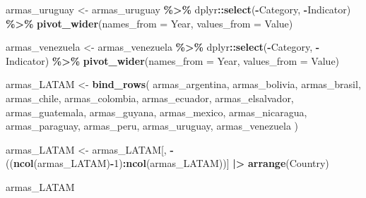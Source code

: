 \documentclass[
  11pt,
]{article}
\newenvironment{Shaded}{\begin{snugshade}}{\end{snugshade}}
\newcommand{\AttributeTok}[1]{\textcolor[rgb]{0.13,0.29,0.53}{#1}}
\newcommand{\DecValTok}[1]{\textcolor[rgb]{0.00,0.00,0.81}{#1}}
\newcommand{\FunctionTok}[1]{\textcolor[rgb]{0.13,0.29,0.53}{\textbf{#1}}}
\newcommand{\NormalTok}[1]{#1}
\newcommand{\OtherTok}[1]{\textcolor[rgb]{0.56,0.35,0.01}{#1}}
\newcommand{\SpecialCharTok}[1]{\textcolor[rgb]{0.81,0.36,0.00}{\textbf{#1}}}
\begin{document}
\begin{Shaded}
\begin{Highlighting}[]
\NormalTok{armas\_uruguay }\OtherTok{\textless{}{-}}\NormalTok{ armas\_uruguay }\SpecialCharTok{\%\textgreater{}\%}
\NormalTok{  dplyr}\SpecialCharTok{::}\FunctionTok{select}\NormalTok{(}\SpecialCharTok{{-}}\NormalTok{Category, }\SpecialCharTok{{-}}\NormalTok{Indicator) }\SpecialCharTok{\%\textgreater{}\%}
  \FunctionTok{pivot\_wider}\NormalTok{(}\AttributeTok{names\_from =}\NormalTok{ Year, }\AttributeTok{values\_from =}\NormalTok{ Value)}

\NormalTok{armas\_venezuela }\OtherTok{\textless{}{-}}\NormalTok{ armas\_venezuela }\SpecialCharTok{\%\textgreater{}\%}
\NormalTok{  dplyr}\SpecialCharTok{::}\FunctionTok{select}\NormalTok{(}\SpecialCharTok{{-}}\NormalTok{Category, }\SpecialCharTok{{-}}\NormalTok{Indicator) }\SpecialCharTok{\%\textgreater{}\%}
  \FunctionTok{pivot\_wider}\NormalTok{(}\AttributeTok{names\_from =}\NormalTok{ Year, }\AttributeTok{values\_from =}\NormalTok{ Value)}

\NormalTok{armas\_LATAM }\OtherTok{\textless{}{-}} \FunctionTok{bind\_rows}\NormalTok{(}
\NormalTok{  armas\_argentina,}
\NormalTok{  armas\_bolivia,}
\NormalTok{  armas\_brasil,}
\NormalTok{  armas\_chile,}
\NormalTok{  armas\_colombia,}
\NormalTok{  armas\_ecuador,}
\NormalTok{  armas\_elsalvador,}
\NormalTok{  armas\_guatemala,}
\NormalTok{  armas\_guyana,}
\NormalTok{  armas\_mexico,}
\NormalTok{  armas\_nicaragua,}
\NormalTok{  armas\_paraguay,}
\NormalTok{  armas\_peru,}
\NormalTok{  armas\_uruguay,}
\NormalTok{  armas\_venezuela}
\NormalTok{)}

\NormalTok{armas\_LATAM }\OtherTok{\textless{}{-}}\NormalTok{ armas\_LATAM[, }\SpecialCharTok{{-}}\NormalTok{((}\FunctionTok{ncol}\NormalTok{(armas\_LATAM)}\SpecialCharTok{{-}}\DecValTok{1}\NormalTok{)}\SpecialCharTok{:}\FunctionTok{ncol}\NormalTok{(armas\_LATAM))] }\SpecialCharTok{|\textgreater{}}
  \FunctionTok{arrange}\NormalTok{(Country)}

\NormalTok{armas\_LATAM}
\end{Highlighting}
\end{Shaded}
\end{document}
